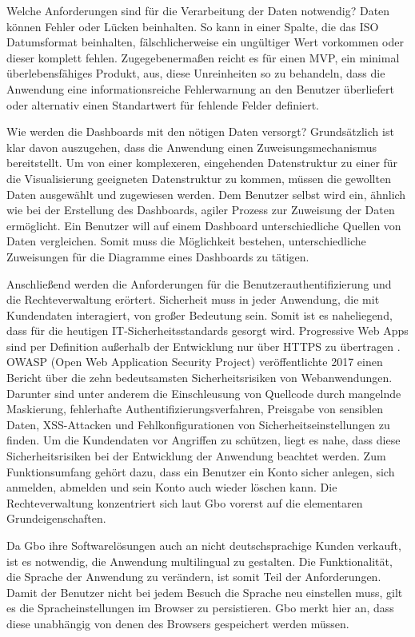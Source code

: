 Welche Anforderungen sind für die Verarbeitung der Daten notwendig? Daten können Fehler oder Lücken
beinhalten. So kann in einer Spalte, die das ISO Datumsformat beinhalten, fälschlicherweise ein
ungültiger Wert vorkommen oder dieser komplett fehlen. Zugegebenermaßen reicht es für einen MVP, ein
minimal überlebensfähiges Produkt, aus, diese Unreinheiten so zu behandeln, dass die Anwendung
eine informationsreiche Fehlerwarnung an den Benutzer überliefert oder alternativ einen Standartwert
für fehlende Felder definiert.

Wie werden die Dashboards mit den nötigen Daten versorgt? Grundsätzlich ist klar davon auszugehen,
dass die Anwendung einen Zuweisungsmechanismus bereitstellt. Um von einer komplexeren, eingehenden
Datenstruktur zu einer für die Visualisierung geeigneten Datenstruktur zu kommen, müssen die gewollten
Daten ausgewählt und zugewiesen werden. Dem Benutzer selbst wird ein, ähnlich wie bei der Erstellung
des Dashboards, agiler Prozess zur Zuweisung der Daten ermöglicht. Ein Benutzer will auf einem
Dashboard unterschiedliche Quellen von Daten vergleichen. Somit muss die Möglichkeit bestehen,
unterschiedliche Zuweisungen für die Diagramme eines Dashboards zu tätigen.

Anschließend werden die Anforderungen für die Benutzerauthentifizierung und die Rechteverwaltung erörtert.
Sicherheit muss in jeder Anwendung, die mit Kundendaten interagiert, von großer Bedeutung sein.
Somit ist es naheliegend, dass für die heutigen IT-Sicherheitsstandards gesorgt wird. Progressive
Web Apps sind per Definition außerhalb der Entwicklung nur über HTTPS zu übertragen \cite[S. 16]{KevinFrankPWAMasterarbeit}.
OWASP (Open Web Application Security Project) veröffentlichte 2017 einen Bericht über die zehn
bedeutsamsten Sicherheitsrisiken von Webanwendungen. Darunter sind unter anderem die Einschleusung
von Quellcode durch mangelnde Maskierung, fehlerhafte Authentifizierungsverfahren, Preisgabe von sensiblen Daten,
XSS-Attacken und Fehlkonfigurationen von Sicherheitseinstellungen zu finden.\cite[S. 4]{OWASPTopTen}
Um die Kundendaten vor Angriffen zu schützen, liegt es nahe, dass diese Sicherheitsrisiken bei der
Entwicklung der Anwendung beachtet werden. Zum Funktionsumfang gehört dazu,
dass ein Benutzer ein Konto sicher anlegen, sich anmelden, abmelden und sein Konto auch wieder
löschen kann. Die Rechteverwaltung konzentriert sich laut Gbo vorerst auf die elementaren
Grundeigenschaften.

Da Gbo ihre Softwarelösungen auch an nicht deutschsprachige Kunden verkauft, ist es notwendig,
die Anwendung multilingual zu gestalten. Die Funktionalität, die Sprache der Anwendung zu verändern,
ist somit Teil der Anforderungen. Damit der Benutzer nicht bei jedem Besuch die Sprache neu einstellen
muss, gilt es die Spracheinstellungen im Browser zu persistieren. Gbo merkt hier an, dass diese
unabhängig von denen des Browsers gespeichert werden müssen.

